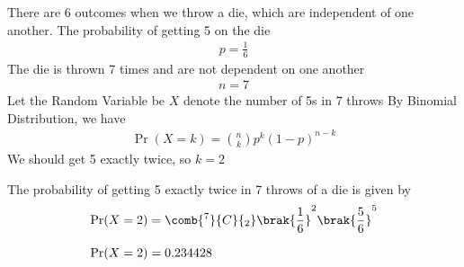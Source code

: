 There are 6 outcomes when we throw a die, which are independent of one another. The probability of getting 5 on the die 
\begin{align}
    p = \frac{1}{6}
\end{align}
The die is thrown 7 times and are not dependent on one another \begin{align}
    n = 7
\end{align}
Let the Random Variable be $X$ denote the number of 5s in 7 throws
By Binomial Distribution, we have
\begin{align}
    \Pr(X=k) = \binom{n}{k}p^k(1-p)^{n-k}
\end{align}
We should get 5 exactly twice, so $ k = 2 $\\
\begin{center}
\begin{table}[h]
\caption{Definition of the variables}
\centering
{}
    \label{tab:1}
\end{table}
\end{center}
The probability of getting 5 exactly twice in 7 throws of a die is given by 
\begin{align}
    \Pr(X=2) &= \comb{^7}{C}{_2}\brak{\frac{1}{6}}^2 \brak{\frac{5}{6}}^5 \\[7pt]
    \Pr(X=2) &= 0.234428
\end{align}
